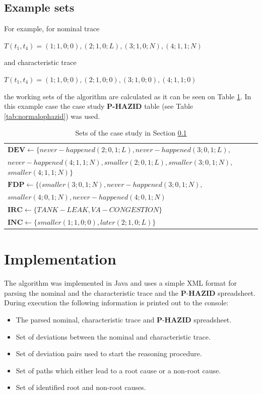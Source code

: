 \documentclass[conference]{IEEEtran}
\begin{document}
\subsection{Example sets}
\label{sec:exsets}

For example, for nominal trace 

$T(t_1,t_4)=(1;1,0;0),(2;1,0;L),(3;1,0;N),(4;1,1;N)$

and characteristic trace 

$T(t_1,t_4)=(1;1,0;0),(2;1,0;0),(3;1,0;0),(4;1,1;0)$

the working sets of the algorithm are calculated as it can be seen on Table \ref{tbl:algVariables}. In this example case the case study \textbf{P-HAZID} table (see Table \ref{tab:normalophazid}) was used.

\begin{table}
\centering
\begin{tabular}{p{12cm}}
\hline
   $\mathbf{DEV} \leftarrow \{ never-happened(2;0,1;L),never-happened(3;0,1;L),$ \\ 
   $never-happened(4;1,1;N),smaller(2;0,1;L),smaller(3;0,1;N),$
   $smaller(4;1,1;N) \}$ \\
   $\mathbf{FDP} \leftarrow \{ (smaller(3;0,1;N),never-happened(3;0,1;N),$\\
   $smaller(4;0,1;N),never-happened(4;0,1;N) $ \\   

   $\mathbf{IRC} \leftarrow \{ TANK-LEAK, VA-CONGESTION \}$ \\
   $\mathbf{INC} \leftarrow \{ smaller(1;1,0;0),later(2;1,0;L)\}$ \\
\hline
\end{tabular}
\caption{Sets of the case study in Section \ref{sec:exsets} }
\label{tbl:algVariables}
\end{table}

\section{Implementation}
The algorithm was implemented in Java and uses a simple XML format for parsing the nominal and the characteristic trace and the $\textbf{P-HAZID}$ spreadsheet. During execution the following information is printed out to the console:

\begin{itemize}
\item The parsed nominal, characteristic trace and $\textbf{P-HAZID}$ spreadsheet.
\item Set of deviations between the nominal and characteristic trace.
\item Set of deviation pairs used to start the reasoning procedure.
\item Set of paths which either lead to a root cause or a non-root cause.
\item Set of identified root and non-root causes.
\end{itemize}
\end{document}
